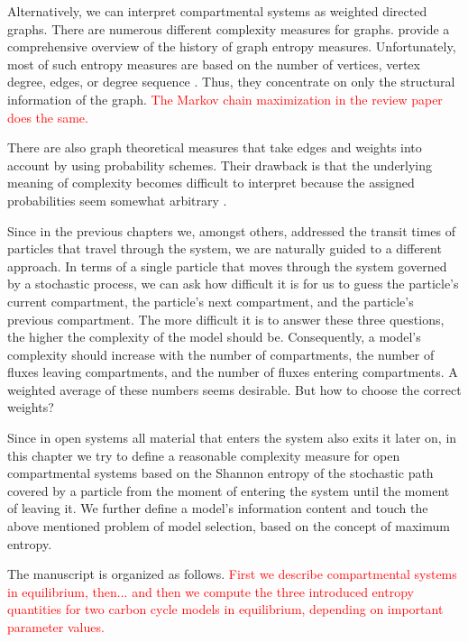 \documentclass[smallextended]{svjour3}
\newcommand{\red}[1]{\textcolor{red}{#1}}
\begin{document}
Alternatively, we can interpret compartmental systems as weighted directed graphs.
There are numerous different complexity measures for graphs. 
\citet{Dehmer2011IS} provide a comprehensive overview of the history of graph entropy measures.
Unfortunately, most of such entropy measures are based on the number of vertices, vertex degree, edges, or degree sequence \citep{Trucco1956BoMB}.
Thus, they concentrate on only the structural information of the graph.
\red{The Markov chain maximization in the review paper does the same.}

There are also graph theoretical measures that take edges and weights into account by using probability schemes.
Their drawback is that the underlying meaning of complexity becomes difficult to interpret because the assigned probabilities seem somewhat arbitrary \citep{Bonchev2005}.

Since in the previous chapters we, amongst others, addressed the transit times of particles that travel through the system, we are naturally guided to a different approach.
In terms of a single particle that moves through the system governed by a stochastic process, we can ask how difficult it is for us to guess the particle's current compartment, the particle's next compartment, and the particle's previous compartment.
The more difficult it is to answer these three questions, the higher the complexity of the model should be. 
Consequently, a model's complexity should increase with the number of compartments, the number of fluxes leaving compartments, and the number of fluxes entering compartments.
A weighted average of these numbers seems desirable.
But how to choose the correct weights?

Since in open systems all material that enters the system also exits it later on, in this chapter we try to define a reasonable complexity measure for open compartmental systems based on the Shannon entropy \citep{Shannon1949TUoIP} of the stochastic path covered by a particle from the moment of entering the system until the moment of leaving it.
We further define a model's information content and touch the above mentioned problem of model selection, based on the concept of maximum entropy.


The manuscript is organized as follows.
\red{First we describe compartmental systems in equilibrium, then... and then we compute the three introduced entropy quantities for two carbon cycle models in equilibrium, depending on important parameter values.}
\end{document}
